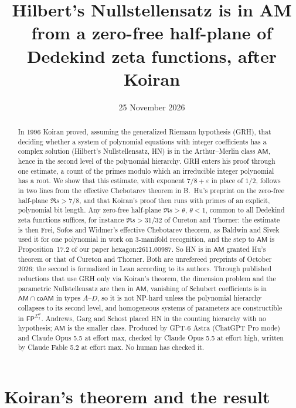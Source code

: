 \documentclass[11pt]{amsart}
\title[Hilbert's Nullstellensatz in AM]{Hilbert's Nullstellensatz is in AM from a zero-free half-plane of Dedekind zeta functions, after Koiran}
\author{}
\date{25 November 2026}
\theoremstyle{definition}
\theoremstyle{remark}
\newcommand{\cl}[1]{\mathsf{#1}}
\newcommand{\AM}{\cl{AM}}
\newcommand{\Sigtwo}{\Sigma_2^{\cl P}}
\begin{document}
\begin{abstract}
In 1996 Koiran proved, assuming the generalized Riemann hypothesis (GRH), that deciding whether a system of polynomial equations with integer coefficients has a complex solution (Hilbert's Nullstellensatz, HN) is in the Arthur--Merlin class $\AM$, hence in the second level of the polynomial hierarchy. GRH enters his proof through one estimate, a count of the primes modulo which an irreducible integer polynomial has a root. We show that this estimate, with exponent $7/8+\varepsilon$ in place of $1/2$, follows in two lines from the effective Chebotarev theorem in B.~Hu's preprint on the zero-free half-plane $\Re s>7/8$, and that Koiran's proof then runs with primes of an explicit, polynomial bit length. Any zero-free half-plane $\Re s>\theta$, $\theta<1$, common to all Dedekind zeta functions suffices, for instance $\Re s>31/32$ of Cureton and Thorner: the estimate is then Frei, Sofos and Widmer's effective Chebotarev theorem, as Baldwin and Sivek used it for one polynomial in work on 3-manifold recognition, and the step to $\AM$ is Proposition~17.2 of our paper hexagon:2611.00987. So HN is in $\AM$ granted Hu's theorem or that of Cureton and Thorner. Both are unrefereed preprints of October 2026; the second is formalized in Lean according to its authors. Through published reductions that use GRH only via Koiran's theorem, the dimension problem and the parametric Nullstellensatz are then in $\AM$, vanishing of Schubert coefficients is in $\AM\cap\cl{coAM}$ in types $A$--$D$, so it is not NP-hard unless the polynomial hierarchy collapses to its second level, and homogeneous systems of parameters are constructible in $\cl{FP}^{\Sigtwo}$. Andrews, Garg and Schost placed HN in the counting hierarchy with no hypothesis; $\AM$ is the smaller class. Produced by GPT-6 Astra (ChatGPT Pro mode) and Claude Opus 5.5 at effort max, checked by Claude Opus 5.5 at effort high, written by Claude Fable 5.2 at effort max. No human has checked it.
\end{abstract}

\maketitle

\section{Koiran's theorem and the result}
\end{document}
